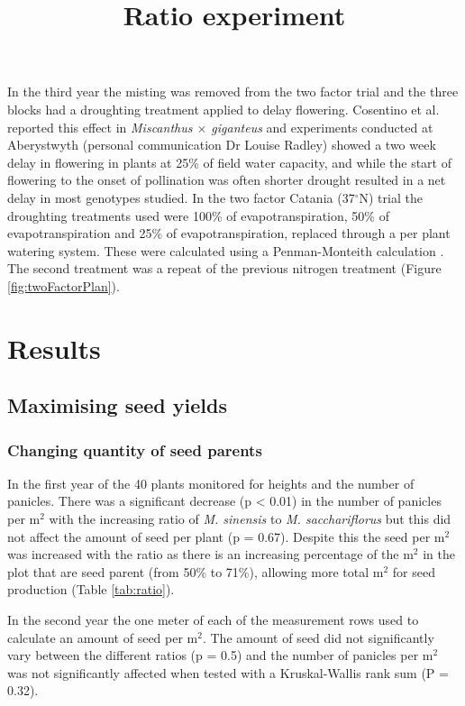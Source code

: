 \documentclass[fleqn, 15pt, lineno]{olplainarticle}
\begin{document}
In the third year the misting was removed from the two factor trial and the three blocks had a droughting treatment applied to delay flowering.
Cosentino et al. \citep{Cosentino2007} reported this effect in \textit{Miscanthus $\times$ giganteus} and experiments conducted at Aberystwyth (personal communication Dr Louise Radley) showed a two week delay in flowering in plants at 25\% of field water capacity, and while the start of flowering to the onset of pollination was often shorter drought resulted in a net delay in most genotypes studied.
In the two factor Catania (37$^{\circ}$N) trial the droughting treatments used were 100\% of evapotranspiration, 50\% of evapotranspiration and 25\% of evapotranspiration, replaced through a per plant watering system.
These were calculated using a Penman-Monteith calculation \citep{Monteith1965}.
The second treatment was a repeat of the previous nitrogen treatment (Figure \ref{fig:twoFactorPlan}).



\FloatBarrier
\section{Results}

\FloatBarrier
\subsection{Maximising seed yields}

\FloatBarrier
\subsubsection{Changing quantity of seed parents}
\title{Ratio experiment}

In the first year of the 40 plants monitored for heights and the number of panicles.
There was a significant decrease (p < 0.01) in the number of panicles per m$^2$ with the increasing ratio of \textit{M. sinensis} to \textit{M. sacchariflorus} but this did not affect the amount of seed per plant (p = 0.67).
Despite this the seed per m$^2$ was increased with the ratio as there is an increasing percentage of the m$^2$ in the plot that are seed parent (from 50\% to 71\%), allowing more total m$^2$ for seed production (Table \ref{tab:ratio}).

In the second year the one meter of each of the measurement rows used to calculate an amount of seed per m$^2$.
The amount of seed did not significantly vary between the different ratios (p = 0.5) and the number of panicles per m$^2$ was not significantly affected when tested with a Kruskal-Wallis rank sum (P = 0.32).
\end{document}
